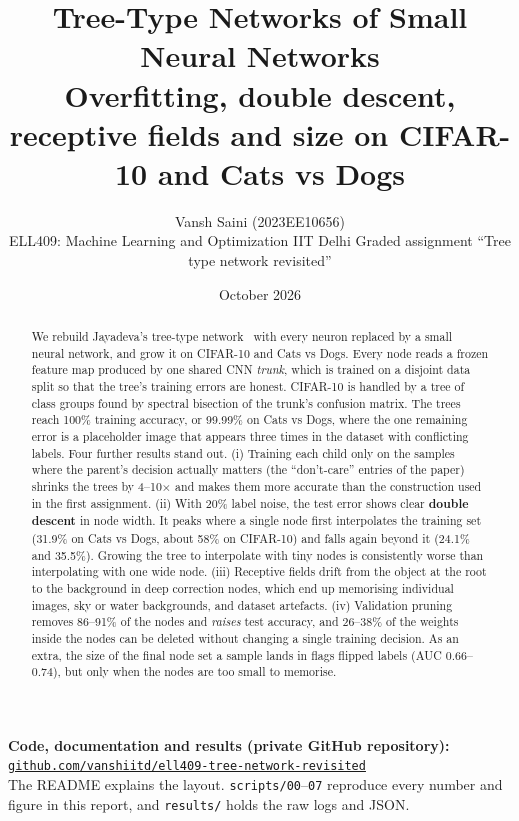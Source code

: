 \documentclass[10.5pt,a4paper]{article}
\title{\vspace{-1.2em}\textbf{Tree-Type Networks of Small Neural Networks}\\[3pt]
\large Overfitting, double descent, receptive fields and size on CIFAR-10 and Cats vs Dogs}
\author{Vansh Saini \quad (2023EE10656)\\[1pt]
\small ELL409: Machine Learning and Optimization \textperiodcentered{} IIT Delhi \textperiodcentered{}
Graded assignment ``Tree type network revisited''}
\date{October 2026}
\newcommand{\repo}{https://github.com/vanshiitd/ell409-tree-network-revisited}
\begin{document}
\maketitle
\vspace{-1.6em}

\begin{center}
\begin{tcolorbox}[enhanced, colback=cNavy!5, colframe=cNavy, boxrule=0.7pt, arc=2pt, width=0.92\textwidth,
                  left=6pt, right=6pt, top=3pt, bottom=3pt]
\raggedright\small\textbf{Code, documentation and results (private GitHub repository):}
\href{\repo}{\texttt{github.com/vanshiitd/ell409-tree-network-revisited}}\\[1pt]
{\footnotesize The README explains the layout. \texttt{scripts/00}--\texttt{07} reproduce every number and figure in this report, and \texttt{results/} holds the raw logs and JSON.}
\end{tcolorbox}
\end{center}

\begin{abstract}
\noindent
We rebuild Jayadeva's tree-type network~\cite{jayadeva2021tree} with every neuron replaced by a small neural
network, and grow it on CIFAR-10 and Cats vs Dogs. Every node reads a frozen feature map produced by one shared CNN
\emph{trunk}, which is trained on a disjoint data split so that the tree's training errors are honest. CIFAR-10 is
handled by a tree of class groups found by spectral bisection of the trunk's confusion matrix. The trees reach
100\% training accuracy, or 99.99\% on Cats vs Dogs, where the one remaining error is a placeholder image that
appears three times in the dataset with conflicting labels. Four further results stand out.
(i) Training each child only on the samples where the parent's decision actually matters (the ``don't-care''
entries of the paper) shrinks the trees by 4--10$\times$ and makes them more accurate than the construction used
in the first assignment.
(ii) With 20\% label noise, the test error shows clear \textbf{double descent} in node width. It peaks where a single
node first interpolates the training set (31.9\% on Cats vs Dogs, about 58\% on CIFAR-10) and falls again beyond it
(24.1\% and 35.5\%). Growing the tree to interpolate with tiny nodes is consistently worse than interpolating with one
wide node.
(iii) Receptive fields drift from the object at the root to the background in deep correction nodes, which end up
memorising individual images, sky or water backgrounds, and dataset artefacts.
(iv) Validation pruning removes 86--91\% of the nodes and \emph{raises} test accuracy, and 26--38\% of the weights inside
the nodes can be deleted without changing a single training decision. As an extra, the size of the final node set a
sample lands in flags flipped labels (AUC 0.66--0.74), but only when the nodes are too small to memorise.
\end{abstract}
\end{document}
